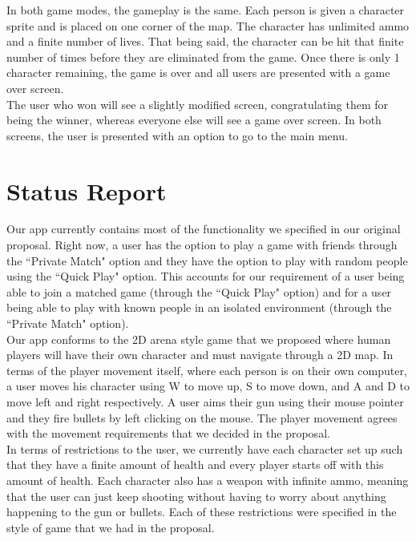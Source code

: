 \documentclass[11pt, oneside]{article}   	%
\begin{document}
In both game modes, the gameplay is the same. Each person is given a character sprite
and is placed on one corner of the map. The character has unlimited ammo and a finite number of lives.
That being said, the character can be hit that finite number of times before they are eliminated
from the game. Once there is only 1 character remaining, the game is over and all users
are presented with a game over screen.\\

The user who won will see a slightly modified screen, congratulating them for being
the winner, whereas everyone else will see a game over screen. In both screens,
the user is presented with an option to go to the main menu.

\clearpage

\section{Status Report}
\hspace*{5mm}
Our app currently contains most of the functionality we specified in our original
proposal. Right now, a user has the option to play a game with friends through the
``Private Match" option and they have the option to play with random people using
the ``Quick Play" option. This accounts for our requirement of a user being able to
join a matched game (through the ``Quick Play" option) and for a user being able to play
with known people in an isolated environment (through the ``Private Match" option).\\

Our app conforms to the 2D arena style game that we proposed where human players will
have their own character and must navigate through a 2D map. In terms of the player
movement itself, where each person is on their own computer, a user moves his character
using W to move up, S to move down, and A and D to move left and right respectively.
A user aims their gun using their mouse pointer and they fire bullets by left clicking
on the mouse. The player movement agrees with the movement requirements that we decided
in the proposal.\\

In terms of restrictions
to the user, we currently have each character set up such that they have a finite amount of
health and every player starts off with this amount of health. Each character also
has a weapon with infinite ammo, meaning that the user can just keep shooting without
having to worry about anything happening to the gun or bullets. Each of these restrictions
were specified in the style of game that we had in the proposal.\\
\end{document}
